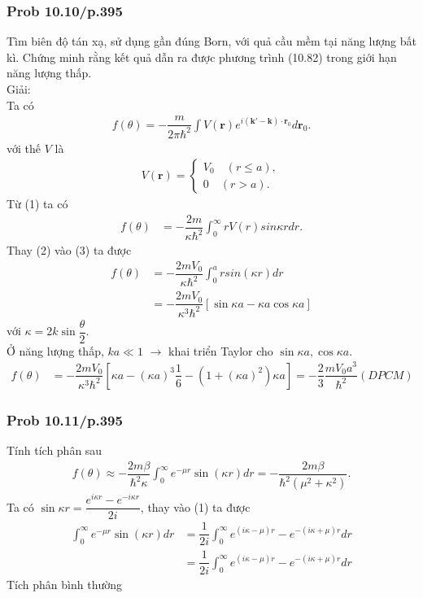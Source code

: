 \documentclass{report}
\newcommand{\f}[2]{\dfrac{#1}{#2}}
\begin{document}
\subsubsection{Prob 10.10/p.395}
Tìm biên độ tán xạ, sử dụng gần đúng Born, với quả cầu mềm tại năng lượng bất kì. Chứng minh rằng kết quả dẫn ra được phương trình (10.82) trong giới hạn năng lượng thấp.\\
Giải:\\
Ta có
\begin{align*}
	f(\theta) = -\f{m}{2\pi \hbar^2} \int V(\mathbf{r}) e^{i(\mathbf{k' - k})\cdot \mathbf{r}_0} d\mathbf{r}_0. \tag{1}
\end{align*}
với thế $V$ là
\begin{align*}
	V(\mathbf{r}) =
	\begin{cases}
		V_0 \quad (r \leq a), \\
		0 \quad (r > a). \tag{2}
	\end{cases}
\end{align*}
Từ (1) ta có
\begin{align*}
	f(\theta)
	 & = -\f{2m}{\kappa\hbar^2} \int_{0}^{\infty} r V(r) sin \kappa r dr. \tag{3}
\end{align*}
Thay (2) vào (3) ta được
\begin{align*}
	f(\theta)
	 & = -\f{2m V_0}{\kappa\hbar^2} \int_{0}^{a} r sin (\kappa r) dr \\
	 & = -\f{2m V_0}{\kappa^3\hbar^2} \left[\sin \kappa a - \kappa a \cos \kappa a\right] \tag{4}
\end{align*}
với $\kappa = 2k\sin \f{\theta}{2}$.\\
Ở năng lượng thấp, $ka \ll 1$ $\rightarrow$ khai triển Taylor cho $\sin \kappa a,\cos \kappa a$.
\begin{align*}
	f(\theta)
	& = -\f{2m V_0}{\kappa^3\hbar^2} \left[ \kappa a - (\kappa a)^3 \f{1}{6} - (1 + (\kappa a)^2) \kappa a \right] = -\f{2}{3} \f{m V_0 a^3}{\hbar^2} (DPCM)
\end{align*}

\subsubsection{Prob 10.11/p.395}
Tính tích phân sau
\begin{align*}
	f(\theta) \approx -\f{2m\beta}{\hbar^2 \kappa} \int_{0}^{\infty} e^{-\mu r} \sin(\kappa r) dr = - \f{2m\beta}{\hbar^2 (\mu^2 + \kappa^2)}. \tag{1}
\end{align*}
Ta có $\sin \kappa r = \f{e^{i\kappa r} - e^{-i\kappa r}}{2i}$, thay vào (1) ta được
\begin{align*}
	\int_{0}^{\infty} e^{-\mu r} \sin(\kappa r) dr
	 & = \f{1}{2i}\int_{0}^{\infty} e^{(i\kappa - \mu) r} - e^{-(i\kappa + \mu) r} dr \\
	 & = \f{1}{2i}\int_{0}^{\infty} e^{(i\kappa - \mu) r} - e^{-(i\kappa + \mu) r} dr
\end{align*}
Tích phân bình thường
\end{document}
